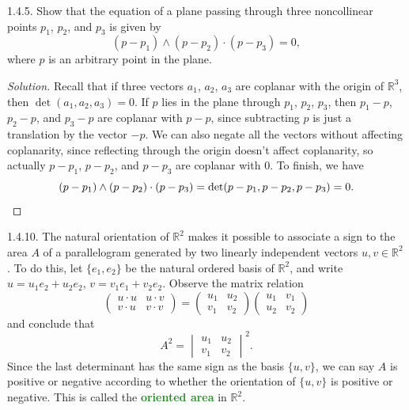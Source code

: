\documentclass[11pt]{scrartcl}
\providecommand{\RR}{\mathbb R}
\newenvironment{soln}{\begin{proof}[Solution]}{\end{proof}}
\providecommand{\vocab}[1]{{\textbf{\textcolor{ForestGreen}{#1}}}}
\begin{document}
\begin{problem*}1.4.5.
	Show that the equation of a plane passing through
	three noncollinear points $p_1$, $p_2$, and $p_3$ is given by
	\[(p - p_1)\wedge(p - p_2)\cdot(p - p_3) = 0,\]
	where $p$ is an arbitrary point in the plane.
\end{problem*}

\begin{soln}
	Recall that if three vectors $a_1$, $a_2$, $a_3$ are coplanar
	with the origin of $\RR^3$, then $\det(a_1,a_2,a_3) = 0$.
	If $p$ lies in the plane through $p_1$, $p_2$, $p_3$, then
	$p_1-p$, $p_2-p$, and $p_3-p$ are coplanar with $p-p$,
	since subtracting $p$ is just a translation by the vector $-p$.
	We can also negate all the vectors without affecting
	coplanarity, since reflecting through the origin doesn't affect
	coplanarity, so actually $p-p_1$, $p-p_2$, and $p-p_3$
	are coplanar with $0$. To finish, we have
	\[(p - p_1)\wedge(p - p_2)\cdot(p - p_3) =
	\det(p-p_1,p-p_2,p-p_3) = 0.\qedhere\]
\end{soln}

\begin{problem*}1.4.10.
	The natural orientation of $\RR^2$ makes it possible to associate
	a sign to the area $A$ of a parallelogram generated by
	two linearly independent vectors $u,v\in\RR^2$. To do this,
	let $\{e_1,e_2\}$ be the natural ordered basis of $\RR^2$,
	and write $u = u_1e_2 + u_2e_2$, $v = v_1e_1 + v_2e_2$.
	Observe the matrix relation
	\[\begin{pmatrix}
		u\cdot u & u\cdot v\\
		v\cdot u & v\cdot v
	\end{pmatrix} =
	\begin{pmatrix}
		u_1&u_2\\v_1&v_2
	\end{pmatrix}
	\begin{pmatrix}
		u_1&v_1\\u_2&v_2
	\end{pmatrix}\]
	and conclude that
	\[A^2 = \begin{vmatrix}
		u_1&u_2\\v_1&v_2
	\end{vmatrix}^2.\]
	Since the last determinant has the same sign as
	the basis $\{u,v\}$, we can say $A$ is positive or negative
	according to whether the orientation of $\{u,v\}$ is positive or negative.
	This is called the \vocab{oriented area} in $\RR^2$.
\end{problem*}
\end{document}
